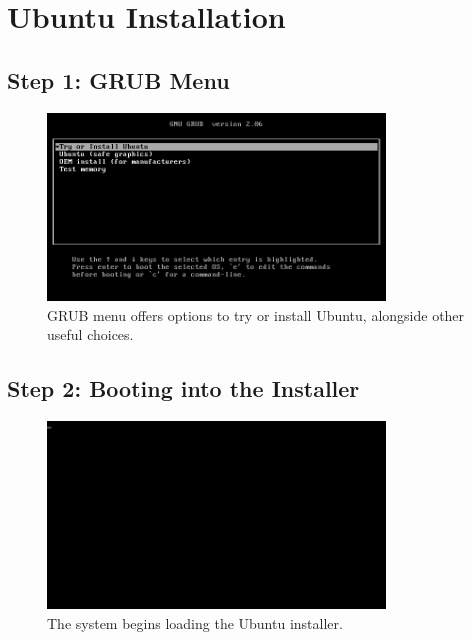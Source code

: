 \documentclass{article}
\begin{document}
\section{Ubuntu Installation}

\subsection{Step 1: GRUB Menu}
\begin{figure}[H]
    \centering
    \includegraphics[width=0.8\textwidth]{2024-09-17_04-24-45.png}
    \caption{GRUB menu offers options to try or install Ubuntu, alongside other useful choices.}
\end{figure}

\subsection{Step 2: Booting into the Installer}
\begin{figure}[H]
    \centering
    \includegraphics[width=0.8\textwidth]{2024-09-17_04-24-57.png}
    \caption{The system begins loading the Ubuntu installer.}
\end{figure}
\end{document}
